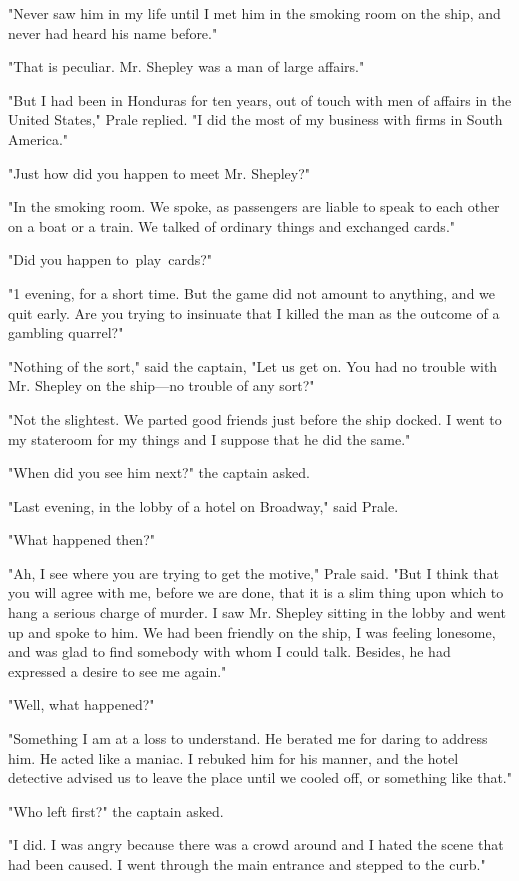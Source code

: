 \documentclass{novel}
\begin{document}
"Never saw him in my life until I met him in the smoking room on the ship, and never had heard his name before."

"That is peculiar. Mr. Shepley was a man of large affairs."

"But I had been in Honduras for ten years, out of touch with men of affairs in the United States," Prale replied. "I did the most of my business with firms in South America."

"Just how did you happen to meet Mr. Shepley?"

"In the smoking room. We spoke, as passengers are liable to speak to each other on a boat or a train. We talked of ordinary things and exchanged cards."

"Did you happen to play cards?"

"1 evening, for a short time. But the game did not amount to anything, and we quit early. Are you trying to insinuate that I killed the man as the outcome of a gambling quarrel?"

"Nothing of the sort," said the captain, "Let us get on. You had no trouble with Mr. Shepley on the ship---no trouble of any sort?"

"Not the slightest. We parted good friends just before the ship docked. I went to my stateroom for my things and I suppose that he did the same."

"When did you see him next?" the captain asked.

"Last evening, in the lobby of a hotel on Broadway," said Prale.

"What happened then?"

"Ah, I see where you are trying to get the motive," Prale said. "But I think that you will agree with me, before we are done, that it is a slim thing upon which to hang a serious charge of murder. I saw Mr. Shepley sitting in the lobby and went up and spoke to him. We had been friendly on the ship, I was feeling lonesome, and was glad to find somebody with whom I could talk. Besides, he had expressed a desire to see me again."

"Well, what happened?"

"Something I am at a loss to understand. He berated me for daring to address him. He acted like a maniac. I rebuked him for his manner, and the hotel detective advised us to leave the place until we cooled off, or something like that."

"Who left first?" the captain asked.

"I did. I was angry because there was a crowd around and I hated the scene that had been caused. I went through the main entrance and stepped to the curb."
\end{document}
